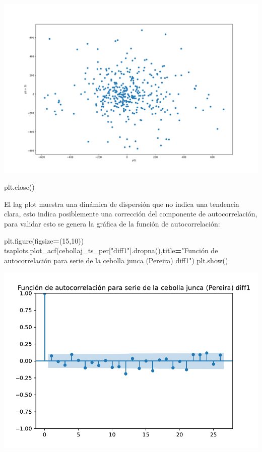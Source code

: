\documentclass[
]{book}
\newenvironment{Shaded}{\begin{snugshade}}{\end{snugshade}}
\newcommand{\DecValTok}[1]{\textcolor[rgb]{0.00,0.00,0.81}{#1}}
\newcommand{\NormalTok}[1]{#1}
\newcommand{\OperatorTok}[1]{\textcolor[rgb]{0.81,0.36,0.00}{\textbf{#1}}}
\newcommand{\StringTok}[1]{\textcolor[rgb]{0.31,0.60,0.02}{#1}}
\begin{document}
\includegraphics{bookdown-demo_files/figure-latex/unnamed-chunk-101-81.pdf}

\begin{Shaded}
\begin{Highlighting}[]
\NormalTok{plt.close()}
\end{Highlighting}
\end{Shaded}

El lag plot muestra una dinámica de dispersión que no indica una tendencia clara, esto indica posiblemente una corrección del componente de autocorrelación, para validar esto se genera la gráfica de la función de autocorrelación:

\begin{Shaded}
\begin{Highlighting}[]

\NormalTok{plt.figure(figsize}\OperatorTok{=}\NormalTok{(}\DecValTok{15}\NormalTok{,}\DecValTok{10}\NormalTok{))}
\NormalTok{tsaplots.plot\_acf(cebollaj\_ts\_per[}\StringTok{"diff1"}\NormalTok{].dropna(),title}\OperatorTok{=}\StringTok{"Función de autocorrelación para serie de la cebolla junca (Pereira) diff1"}\NormalTok{)}
\NormalTok{plt.show()}
\end{Highlighting}
\end{Shaded}

\includegraphics{bookdown-demo_files/figure-latex/unnamed-chunk-102-83.pdf}
\end{document}
